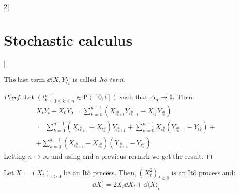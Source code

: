\documentclass[../../../main_math.tex]{subfiles}
\begin{document}
\begin{multicols}{2}[\section{Stochastic calculus}]
\begin{theorem}
$$    $$
    The last term $\dd{{\langle X,Y\rangle}_t}$ is called \emph{Itô term}.
  \end{theorem}
  \begin{proof}
    Let ${(t_k^n)}_{0\leq k\leq n}\in \mathrm{P}([0,t])$ such that $\Delta_n\to 0$. Then:
    \begin{multline*}
      X_tY_t-X_0Y_0=\sum_{k=0}^{n-1}(X_{t_{k+1}^n}Y_{t_{k+1}^n}-X_{t_k^n}Y_{t_k^n})=\\=\sum_{k=0}^{n-1}(X_{t_{k+1}^n}-X_{t_k^n})Y_{t_{k+1}^n}+\sum_{k=0}^{n-1}X_{t_k^n}(Y_{t_{k+1}^n}-Y_{t_k^n})+\\+\sum_{k=0}^{n-1}(X_{t_{k+1}^n}-X_{t_k^n})(Y_{t_{k+1}^n}-Y_{t_k^n})
    \end{multline*}
    Letting $n\to\infty$ and using  and a previous remark we get the result.
  \end{proof}
  \begin{corollary}
    Let $X={(X_t)}_{t\geq 0}$ be an Itô process. Then, ${(X_t^2)}_{t\geq 0}$ is an Itô process and:
    $$
      \dd{X_t^2}=2X_t\dd{X_t}+\dd{{\langle X\rangle}_t}
    $$
  \end{corollary}

\end{multicols}
\end{document}
